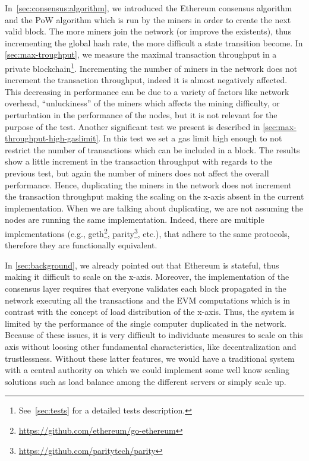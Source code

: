 In~\autoref{sec:consensus:algorithm}, we introduced the Ethereum consensus
algorithm and the PoW algorithm which is run by the miners in order to create
the next valid block. The more miners join the network (or improve the
existents), thus incrementing the global hash rate, the more difficult a state
transition become. In \autoref{sec:max-troughput}, we measure the maximal
transaction throughput in a private blockchain\footnote{See~\autoref{sec:tests}
for a detailed tests description.}. Incrementing the number of miners in the
network does not increment the transaction throughput, indeed it is almost
negatively affected. This decreasing in performance can be due to a variety of
factors like network overhead, ``unluckiness'' of the miners which affects the
mining difficulty, or perturbation in the performance of the nodes, but it is
not relevant for the purpose of the test. Another significant test we present is
described in \autoref{sec:max-throughput-high-gaslimit}. In this test we set a
gas limit high enough to not restrict the number of transactions which can be
included in a block. The results show a little increment in the transaction
throughput with regards to the previous test, but again the number of miners
does not affect the overall performance. Hence, duplicating the miners in the
network does not increment the transaction throughput making the scaling on the
x-axis absent in the current implementation. When we are talking about
duplicating, we are not assuming the nodes are running the same implementation.
Indeed, there are multiple implementations (e.g.,
geth\footnote{\url{https://github.com/ethereum/go-ethereum}},
parity\footnote{\url{https://github.com/paritytech/parity}}, etc.), that adhere
to the same protocols, therefore they are functionally equivalent.

In \autoref{sec:background}, we already pointed out that Ethereum is stateful,
thus making it difficult to scale on the x-axis. Moreover, the implementation of
the consensus layer requires that everyone validates each block propagated in
the network executing all the transactions and the EVM computations which is in
contrast with the concept of load distribution of the x-axis. Thus, the system
is limited by the performance of the single computer duplicated in the network.
Because of these issues, it is very difficult to individuate measures to scale
on this axis without loosing other fundamental characteristics, like
decentralization and trustlessness. Without these latter features, we would have
a traditional system with a central authority on which we could implement some
well know scaling solutions such as load balance among the different servers or
simply scale up.
